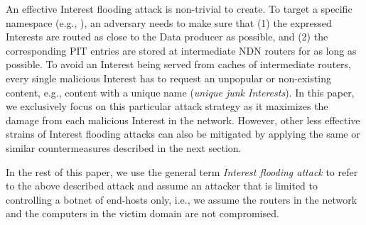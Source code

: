 
An effective Interest flooding attack is non-trivial to create.
To target a specific namespace (e.g., ), an adversary needs to make sure that (1) the expressed Interests are routed as close to the Data producer as possible, and (2) the corresponding PIT entries are stored at intermediate NDN routers for as long as possible.
To avoid an Interest being served from caches of intermediate routers, every single malicious Interest has to request an unpopular or non-existing content, e.g., content with a unique name (\emph{unique junk Interests}). In this paper, we exclusively focus on this particular attack strategy as it maximizes the damage from each malicious Interest in the network. However, other less effective strains of Interest flooding attacks can also be mitigated by applying the same or similar countermeasures described in the next section.  

In the rest of this paper, we use the general term \emph{Interest flooding attack} to refer to the above described attack and assume an attacker that is limited to controlling a botnet of end-hosts only, i.e., we assume the routers in the network and the computers in the victim domain are not compromised.




